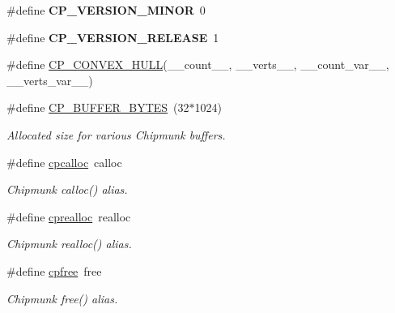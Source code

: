 \begin{DoxyCompactItemize}
\item 
\mbox{\label{group__misc_ga015d989acd6a013e84ea8696953172a8}} 
\#define {\bfseries C\+P\+\_\+\+V\+E\+R\+S\+I\+O\+N\+\_\+\+M\+I\+N\+OR}~0
\item 
\mbox{\label{group__misc_ga0311c28764c81d74c3c76570bb92c57f}} 
\#define {\bfseries C\+P\+\_\+\+V\+E\+R\+S\+I\+O\+N\+\_\+\+R\+E\+L\+E\+A\+SE}~1
\item 
\#define \hyperlink{group__misc_ga9abe29a1fe6d1f2041e95f2fb2e2ce1c}{C\+P\+\_\+\+C\+O\+N\+V\+E\+X\+\_\+\+H\+U\+LL}(\+\_\+\+\_\+count\+\_\+\+\_\+,  \+\_\+\+\_\+verts\+\_\+\+\_\+,  \+\_\+\+\_\+count\+\_\+var\+\_\+\+\_\+,  \+\_\+\+\_\+verts\+\_\+var\+\_\+\+\_\+)
\item 
\mbox{\label{group__misc_ga6d034fec4d7962b6f20f9e243527c560}} 
\#define \hyperlink{group__misc_ga6d034fec4d7962b6f20f9e243527c560}{C\+P\+\_\+\+B\+U\+F\+F\+E\+R\+\_\+\+B\+Y\+T\+ES}~(32$\ast$1024)
\begin{DoxyCompactList}\small\item\em Allocated size for various Chipmunk buffers. \end{DoxyCompactList}\item 
\mbox{\label{group__misc_gac88bab87ecc7db6cc222679bf6082e9b}} 
\#define \hyperlink{group__misc_gac88bab87ecc7db6cc222679bf6082e9b}{cpcalloc}~calloc
\begin{DoxyCompactList}\small\item\em Chipmunk calloc() alias. \end{DoxyCompactList}\item 
\mbox{\label{group__misc_gab3544b888840ed34e49bb0559d6849a8}} 
\#define \hyperlink{group__misc_gab3544b888840ed34e49bb0559d6849a8}{cprealloc}~realloc
\begin{DoxyCompactList}\small\item\em Chipmunk realloc() alias. \end{DoxyCompactList}\item 
\mbox{\label{group__misc_ga14627263deb67605201281bac734eb04}} 
\#define \hyperlink{group__misc_ga14627263deb67605201281bac734eb04}{cpfree}~free
\begin{DoxyCompactList}\small\item\em Chipmunk free() alias. \end{DoxyCompactList}\item 

\end{DoxyCompactItemize}
